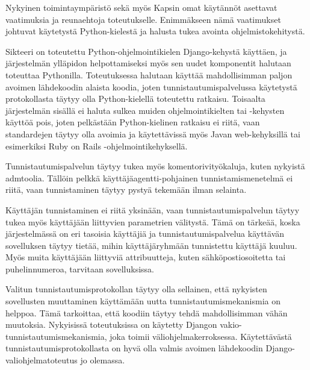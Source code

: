 Nykyinen toimintaympäristö sekä myös Kapsin omat käytännöt asettavat vaatimuksia ja reunaehtoja toteutukselle. Enimmäkseen nämä vaatimukset johtuvat käytetystä Python-kielestä ja halusta tukea avointa ohjelmistokehitystä.

Sikteeri on toteutettu Python-ohjelmointikielen Django-kehystä käyttäen, ja järjestelmän ylläpidon helpottamiseksi myös sen uudet komponentit halutaan toteuttaa Pythonilla. Toteutuksessa halutaan käyttää mahdollisimman paljon avoimen lähdekoodin alaista koodia, joten tunnistautumispalvelussa käytetystä protokollasta täytyy olla Python-kielellä toteutettu ratkaisu. Toisaalta järjestelmän sisällä ei haluta sulkea muiden ohjelmointikielten tai -kehysten käyttöä pois, joten pelkästään Python-kielinen ratkaisu ei riitä, vaan standardejen täytyy olla avoimia ja käytettävissä myös Javan web-kehyksillä tai esimerkiksi Ruby on Rails -ohjelmointikehyksellä.

Tunnistautumispalvelun täytyy tukea myös komentorivityökaluja, kuten nykyistä admtoolia. Tällöin pelkkä käyttäjäagentti-pohjainen tunnistamismenetelmä ei riitä, vaan tunnistaminen täytyy pystyä tekemään ilman selainta.

Käyttäjän tunnistaminen ei riitä yksinään, vaan tunnistautumispalvelun täytyy tukea myös käyttäjään liittyvien parametrien välitystä. Tämä on tärkeää, koska järjestelmässä on eri tasoisia käyttäjiä ja tunnistautumispalvelua käyttävän sovelluksen täytyy tietää, mihin käyttäjäryhmään tunnistettu käyttäjä kuuluu. Myös muita käyttäjään liittyviä attribuutteja, kuten sähköpostiosoitetta tai puhelinnumeroa, tarvitaan sovelluksissa.

Valitun tunnistautumisprotokollan täytyy olla sellainen, että nykyisten sovellusten muuttaminen käyttämään uutta tunnistautumismekanismia on helppoa. Tämä tarkoittaa, että koodiin täytyy tehdä mahdollisimman vähän muutoksia. Nykyisissä toteutuksissa on käytetty Djangon vakio-tunnistautumismekanismia, joka toimii väliohjelmakerroksessa. Käytettävästä tunnistautumisprotokollasta on hyvä olla valmis avoimen lähdekoodin Django-valiohjelmatoteutus jo olemassa.